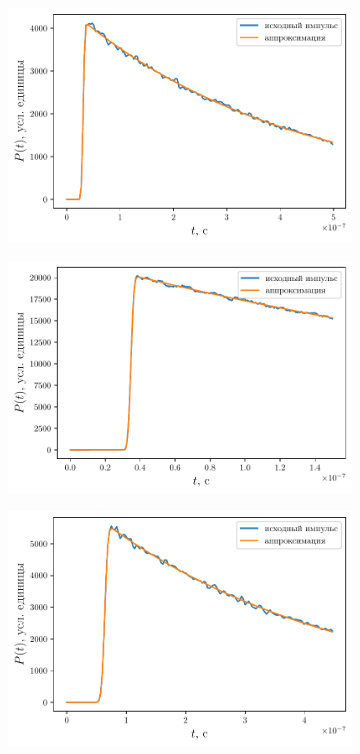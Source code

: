 \begin{figure}[ht]
    \begin{subfigure}{0.5\linewidth}
        \centering
        \includegraphics[width=\linewidth]{fig/retracking/imp08_7_3}
    \end{subfigure}
    \begin{subfigure}{0.5\linewidth}
        \centering
        \includegraphics[width=\linewidth]{fig/retracking/imp_5_3}
    \end{subfigure}
    \begin{subfigure}{0.5\linewidth}
        \centering
        \includegraphics[width=\linewidth]{fig/retracking/imp04_10_3}

\end{subfigure}
\end{figure}
